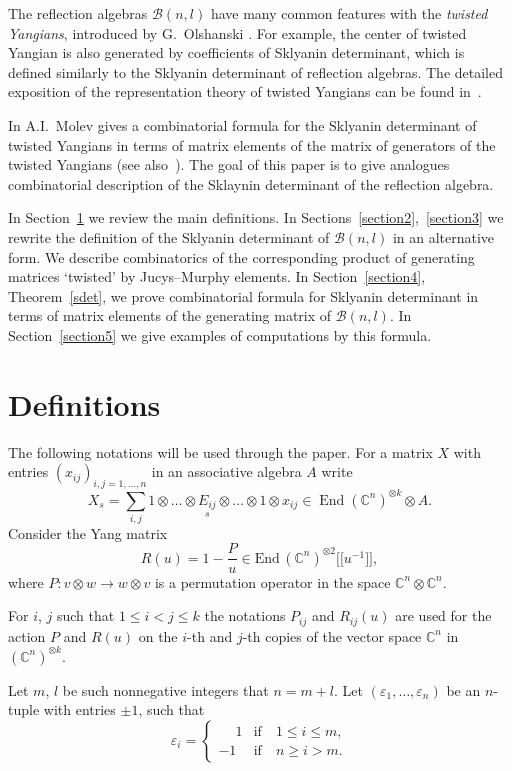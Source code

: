 \documentclass[pdftex]{sigma}
\newcommand{\CC}{\mathbb C}    %
\newcommand{\B}{\mathcal B}
\begin{document}
 The    ref\/lection algebras $\B(n,l)$  have many common features with the  {\it twisted Yangians}, introduced by G.~Olshanski \cite{Olsh}.
 For example, the center of twisted Yangian   is  also generated by coef\/f\/icients of Sklyanin determinant, which is  def\/ined similarly to the  Sklyanin determinant of ref\/lection algebras.
 The detailed exposition of the representation  theory of twisted Yangians can be found in~\cite{Mol1, Mol}.

 In \cite{Mol3} A.I.~Molev
gives a combinatorial formula  for the Sklyanin determinant of twisted Yangians in terms of matrix elements of the matrix of generators of the twisted Yangians (see also~\cite{Mol1}).
 The goal of this paper is to give  analogues combinatorial description of the Sklaynin determinant of the ref\/lection algebra.

 In Section~\ref{section1} we review the main def\/initions. In Sections~\ref{section2},~\ref{section3} we rewrite the def\/inition of the Sklyanin determinant of $\B(n,l)$
in an alternative form. We  describe combinatorics of the corresponding product of generating matrices `twisted' by Jucys--Murphy elements. In Section~\ref{section4}, Theorem~\ref{sdet}, we prove combinatorial formula for Sklyanin determinant in terms of matrix elements of the generating matrix of $\B(n,l)$.  In Section~\ref{section5} we give examples of computations by this formula.

\section{Def\/initions}\label{section1}
The following  notations will be used through the paper.
For a matrix  $X$ with entries $(x_{ij})_{i,j=1,\dots, n}$ in an  associative algebra $A$ write
\[
X_s=\sum_{i,j}1\otimes\dots\otimes \underset{s}{E_{ij}}\otimes\dots \otimes 1\otimes x_{ij} \in\operatorname{End}(\CC^n)^{\otimes k}\otimes A.
\]
 Consider the Yang matrix
\[
R(u)=1-\frac{P}{u}  \in \text{End}\,(\CC^n)^{\otimes 2}\big[\big[u^{-1}\big]\big],
\]
where $P:v\otimes w\to w\otimes v$ is a permutation operator in the space $\CC^n\otimes\CC^n$.

 For $i$, $j$ such that $1\le i < j\le k$ the notations $P_{ij}$ and
  $R_{ij}(u)$   are used  for the  action $P$ and  $R(u)$ on the $i$-th and $j$-th copies of  the vector space $\CC^n$ in $(\CC^n)^{\otimes k}$.

 Let $m$, $l$ be such nonnegative integers that $n=m+l$. Let $(\varepsilon _1,\dots, \varepsilon_n)$ be an $n$-tuple with entries $\pm 1$, such that
\[
 \varepsilon_i=
 \begin{cases}
\phantom{-}1& \text{if}\quad 1\le i\le m,\\
 {-}1& \text{if}\quad n\ge i> m.
 \end{cases}
\]
\end{document}
